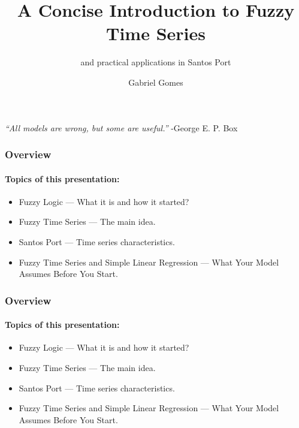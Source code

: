 \documentclass[13pt]{beamer}
\begin{document}
	\author{Gabriel Gomes}
	\title{A Concise Introduction to Fuzzy Time Series}
	\subtitle{and practical applications in Santos Port}
	\date{}
	
	\begin{frame}[plain]
		\maketitle{}
	\end{frame}
	
	\begin{frame}
		\begin{center}
			\Large \textit{``All models are wrong, but some are useful.''} \newline
			\normalsize	-George E. P. Box
		\end{center}
	\end{frame}
	
	\begin{frame}
		\frametitle{Overview}
		\framesubtitle{Topics of this presentation:}
		\begin{itemize}
			\item<1-1> Fuzzy Logic — What it is and how it started?
			\item<2-2> Fuzzy Time Series — The main idea.
			\item<3-3> Santos Port — Time series characteristics.
			\item<4-4> Fuzzy Time Series and Simple Linear Regression — What Your Model Assumes Before You Start.
		\end{itemize}
	\end{frame}
	
	\begin{frame}
		\frametitle{Overview}
		\framesubtitle{Topics of this presentation:}
		\begin{itemize}
			\setlength{\itemsep}{2em}
			\item Fuzzy Logic — What it is and how it started?
			\item Fuzzy Time Series — The main idea. 
			\item Santos Port — Time series characteristics.
			\item Fuzzy Time Series and Simple Linear Regression — What Your Model Assumes Before You Start.
		\end{itemize}
	\end{frame}
	
\end{document}
